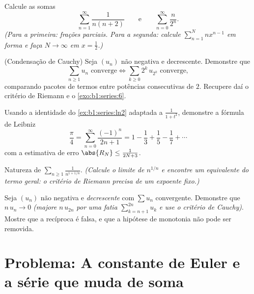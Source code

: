 \begin{exercise}[$\star\star$]\label{exo:b1:series:8}
Calcule as somas
\[
\sum_{n=1}^{\infty} \frac{1}{n(n+2)}
\qquad\text{e}\qquad
\sum_{n=0}^{\infty} \frac{n}{2^n} .
\]
\emph{(Para a primeira: frações parciais. Para a segunda: calcule
$\sum_{n=1}^{N} n x^{n-1}$ em forma  e faça $N \to \infty$ em
$x = \frac12$.)}
\end{exercise}

\begin{exercise}[$\star\star\star$]\label{exo:b1:series:9}
(Condensação de Cauchy) Seja $(u_n)$ não negativa e decrescente.
Demonstre que
\[
\sum_{n \geq 1} u_n \text{ converge}
\iff
\sum_{k \geq 0} 2^k\, u_{2^k} \text{ converge},
\]
comparando pacotes de termos entre potências consecutivas de $2$.
Recupere daí o critério de Riemann e o
\cref{exo:b1:series:6}.
\end{exercise}

\begin{exercise}[$\star\star\star$]\label{exo:b1:series:10}
Usando a identidade  do \cref{ex:b1:series:ln2} adaptada a
$\frac{1}{1+t^2}$, demonstre a fórmula de Leibniz
\[
\frac{\pi}{4} = \sum_{n=0}^{\infty} \frac{(-1)^n}{2n+1}
= 1 - \frac13 + \frac15 - \frac17 + \cdots
\]
com a estimativa de erro $\abs{R_N} \leq \frac{1}{2N+3}$.
\end{exercise}

\begin{exercise}[$\star\star$]\label{exo:b1:series:11}
Natureza de $\displaystyle\sum_{n \geq 1} \frac{1}{n^{1 + 1/n}}$.
\emph{(Calcule o limite de $n^{1/n}$ e encontre um equivalente do
termo geral: o critério de Riemann precisa de um expoente
\emph{fixo}.)}
\end{exercise}

\begin{exercise}[$\star\star\star$]\label{exo:b1:series:12}
Seja $(u_n)$ não negativa e \emph{decrescente} com $\sum u_n$
convergente. Demonstre que $n\,u_n \to 0$ \emph{(majore $n\,u_{2n}$
por uma fatia $\sum_{k=n+1}^{2n} u_k$ e use o critério de Cauchy)}. Mostre que a
recíproca é falsa, e que a hipótese de monotonia não pode ser
removida.
\end{exercise}

\section{Problema: A constante de Euler e a série que muda de
soma}

